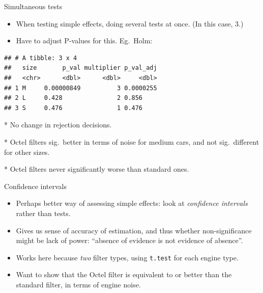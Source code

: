 \documentclass[ignorenonframetext,]{beamer}
\newenvironment{Shaded}{\begin{snugshade}}{\end{snugshade}}
\newcommand{\DataTypeTok}[1]{\textcolor[rgb]{0.13,0.29,0.53}{#1}}
\newcommand{\DecValTok}[1]{\textcolor[rgb]{0.00,0.00,0.81}{#1}}
\newcommand{\KeywordTok}[1]{\textcolor[rgb]{0.13,0.29,0.53}{\textbf{#1}}}
\newcommand{\NormalTok}[1]{#1}
\newcommand{\OperatorTok}[1]{\textcolor[rgb]{0.81,0.36,0.00}{\textbf{#1}}}
\newcommand{\StringTok}[1]{\textcolor[rgb]{0.31,0.60,0.02}{#1}}
\begin{document}
\begin{frame}[fragile]{Simultaneous tests}
\protect\hypertarget{simultaneous-tests}{}

\begin{itemize}
\item
  When testing simple effects, doing several tests at once. (In this
  case, 3.)
\item
  Have to adjust P-values for this. Eg.~Holm:
\end{itemize}

\begin{Shaded}
\end{Shaded}

\begin{verbatim}
## # A tibble: 3 x 4
##   size       p_val multiplier p_val_adj
##   <chr>      <dbl>      <dbl>     <dbl>
## 1 M     0.00000849          3 0.0000255
## 2 L     0.428               2 0.856    
## 3 S     0.476               1 0.476
\end{verbatim}

\begin{footnotesize}

* No change in rejection decisions.

* Octel filters sig.\ better in terms of noise for
medium cars, and not sig.\ different for other sizes.

* Octel filters never significantly worse than standard
ones. 
\end{footnotesize}

\end{frame}

\begin{frame}[fragile]{Confidence intervals}
\protect\hypertarget{confidence-intervals}{}

\begin{itemize}
\item
  Perhaps better way of assessing simple effects: look at
  \emph{confidence intervals} rather than tests.
\item
  Gives us sense of accuracy of estimation, and thus whether
  non-significance might be lack of power: ``absence of evidence is not
  evidence of absence''.
\item
  Works here because \emph{two} filter types, using \texttt{t.test} for
  each engine type.
\item
  Want to show that the Octel filter is equivalent to or better than the
  standard filter, in terms of engine noise.
\end{itemize}

\end{frame}
\end{document}
